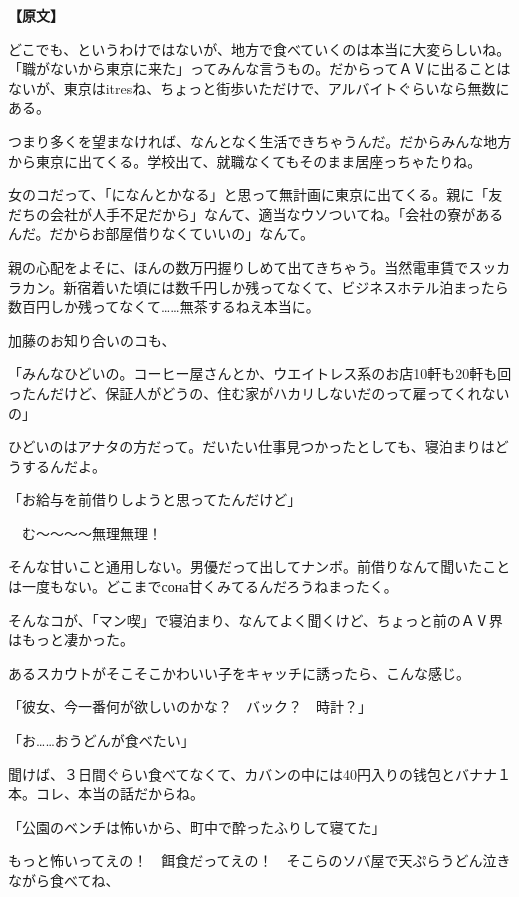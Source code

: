 \documentclass[12pt,UTF8]{ctexbook}
\begin{document}
\vspace{1ex}
\parbox{0.9\linewidth}{
\textbf{【原文】}\par
\addtocounter{jafootnote}{1}\textsuperscript{}%

どこでも、というわけではないが、地方で食べていくのは本当に大変らしいね。「職がないから東京に来た」ってみんな言うもの。だからってＡⅤに出ることはないが、東京はitresね、ちょっと街歩いただけで、アルバイトぐらいなら無数にある。

つまり多くを望まなければ、なんとなく生活できちゃうんだ。だからみんな地方から東京に出てくる。学校出て、就職なくてもそのまま居座っちゃたりね。

女のコだって、「になんとかなる」と思って無計画に東京に出てくる。親に「友だちの会社が人手不足だから」なんて、適当なウソついてね。「会社の寮があるんだ。だからお部屋借りなくていいの」なんて。

親の心配をよそに、ほんの数万円握りしめて出てきちゃう。当然電車賃でスッカラカン。新宿着いた頃には数千円しか残ってなくて、ビジネスホテル泊まったら数百円しか残ってなくて……無茶するねえ本当に。

加藤のお知り合いのコも、

「みんなひどいの。コーヒー屋さんとか、ウエイトレス系のお店10軒も20軒も回ったんだけど、保証人がどうの、住む家がハカリしないだのって雇ってくれないの」

ひどいのはアナタの方だって。だいたい仕事見つかったとしても、寝泊まりはどうするんだよ。

「お給与を前借りしようと思ってたんだけど」

　む～～～～無理無理！

そんな甘いこと通用しない。男優だって出してナンボ。前借りなんて聞いたことは一度もない。どこまでсона甘くみてるんだろうねまったく。

そんなコが、「マン喫」で寝泊まり、なんてよく聞くけど、ちょっと前のＡⅤ界はもっと凄かった。

あるスカウトがそこそこかわいい子をキャッチに誘ったら、こんな感じ。

「彼女、今一番何が欲しいのかな？　バック？　時計？」

「お……おうどんが食べたい」

聞けば、３日間ぐらい食べてなくて、カバンの中には40円入りの钱包とバナナ１本。コレ、本当の話だからね。

「公園のベンチは怖いから、町中で酔ったふりして寝てた」

もっと怖いってえの！　餌食だってえの！　そこらのソバ屋で天ぷらうどん泣きながら食べてね、

}
\end{document}
